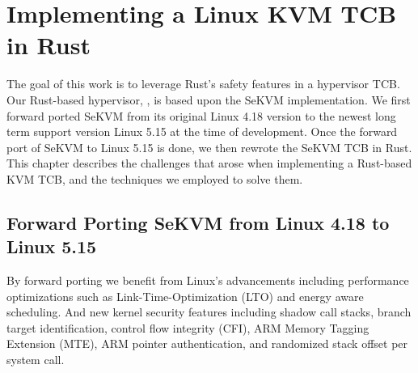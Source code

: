 \chapter{Implementing a Linux KVM TCB in Rust}
\label{sec:rewrite}



The goal of this work is to leverage Rust's safety features in a hypervisor TCB.
Our Rust-based hypervisor, \rustsec{}, is based upon the SeKVM implementation.
We first forward ported SeKVM from its original Linux 4.18 version to the
newest long term support version Linux 5.15 at the time of development.
Once the forward port of SeKVM to Linux 5.15 is done, we then rewrote the SeKVM
TCB \secore{} in Rust. This chapter describes the challenges that arose when
implementing a Rust-based KVM TCB, and the techniques we employed to solve them.

\section{Forward Porting SeKVM from Linux 4.18 to Linux 5.15}
By forward porting we benefit from Linux's advancements including performance
optimizations such as Link-Time-Optimization (LTO) and energy aware scheduling.
And new kernel security features including  shadow call stacks,
branch target identification, control flow integrity (CFI), ARM Memory Tagging
Extension (MTE), ARM pointer authentication, and randomized stack offset per
system call.


